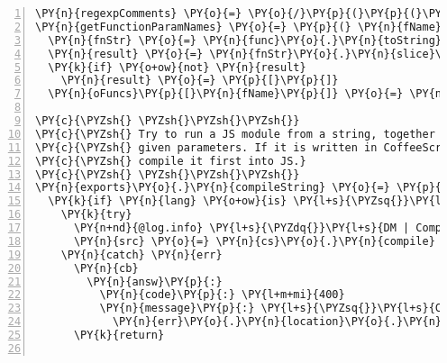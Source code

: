 \begin{Verbatim}[fontsize=\scriptsize,commandchars=\\\{\},numbers=left,firstnumber=1,stepnumber=1]
\PY{n}{regexpComments} \PY{o}{=} \PY{o}{/}\PY{p}{(}\PY{p}{(}\PYZbs{}\PY{o}{/}\PYZbs{}\PY{o}{/}\PY{o}{.}\PY{o}{*}\PY{err}{\PYZdl{}}\PY{p}{)}\PY{o}{|}\PY{p}{(}\PYZbs{}\PY{o}{/}\PYZbs{}\PY{o}{*}\PY{p}{[}\PYZbs{}\PY{n}{s}\PYZbs{}\PY{n}{S}\PY{p}{]}\PY{o}{*}\PY{err}{?}\PYZbs{}\PY{o}{*}\PYZbs{}\PY{o}{/}\PY{p}{)}\PY{p}{)}\PY{o}{/}\PY{n}{mg}\PY{p}{;}
\PY{n}{getFunctionParamNames} \PY{o}{=} \PY{p}{(} \PY{n}{fName}\PY{p}{,} \PY{n}{func}\PY{p}{,} \PY{n}{oFuncs} \PY{p}{)} \PY{o}{\PYZhy{}}\PY{o}{\PYZgt{}}
  \PY{n}{fnStr} \PY{o}{=} \PY{n}{func}\PY{o}{.}\PY{n}{toString}\PY{p}{(}\PY{p}{)}\PY{o}{.}\PY{n}{replace} \PY{n}{regexpComments}\PY{p}{,} \PY{l+s}{\PYZsq{}}\PY{l+s}{\PYZsq{}}
  \PY{n}{result} \PY{o}{=} \PY{n}{fnStr}\PY{o}{.}\PY{n}{slice}\PY{p}{(} \PY{n}{fnStr}\PY{o}{.}\PY{n}{indexOf}\PY{p}{(} \PY{l+s}{\PYZsq{}}\PY{l+s}{(}\PY{l+s}{\PYZsq{}} \PY{p}{)} \PY{o}{+} \PY{l+m+mi}{1}\PY{p}{,} \PY{n}{fnStr}\PY{o}{.}\PY{n}{indexOf}\PY{p}{(} \PY{l+s}{\PYZsq{}}\PY{l+s}{)}\PY{l+s}{\PYZsq{}} \PY{p}{)} \PY{p}{)}\PY{o}{.}\PY{n}{match} \PY{o}{/}\PY{p}{(}\PY{p}{[}\PY{o}{\PYZca{}}\PYZbs{}\PY{n}{s}\PY{p}{,}\PY{p}{]}\PY{o}{+}\PY{p}{)}\PY{o}{/}\PY{n}{g}
  \PY{k}{if} \PY{o+ow}{not} \PY{n}{result}
    \PY{n}{result} \PY{o}{=} \PY{p}{[}\PY{p}{]}
  \PY{n}{oFuncs}\PY{p}{[}\PY{n}{fName}\PY{p}{]} \PY{o}{=} \PY{n}{result}

\PY{c}{\PYZsh{} \PYZsh{}\PYZsh{}\PYZsh{}}
\PY{c}{\PYZsh{} Try to run a JS module from a string, together with the}
\PY{c}{\PYZsh{} given parameters. If it is written in CoffeeScript we}
\PY{c}{\PYZsh{} compile it first into JS.}
\PY{c}{\PYZsh{} \PYZsh{}\PYZsh{}\PYZsh{}}
\PY{n}{exports}\PY{o}{.}\PY{n}{compileString} \PY{o}{=} \PY{p}{(} \PY{n}{src}\PY{p}{,} \PY{n}{userId}\PY{p}{,} \PY{n}{oRule}\PY{p}{,} \PY{n}{modId}\PY{p}{,} \PY{n}{lang}\PY{p}{,} \PY{n}{modType}\PY{p}{,} \PY{n}{dbMod}\PY{p}{,} \PY{n}{cb} \PY{p}{)} \PY{o}{=}\PY{o}{\PYZgt{}}
  \PY{k}{if} \PY{n}{lang} \PY{o+ow}{is} \PY{l+s}{\PYZsq{}}\PY{l+s}{CoffeeScript}\PY{l+s}{\PYZsq{}}
    \PY{k}{try}
      \PY{n+nd}{@log.info} \PY{l+s}{\PYZdq{}}\PY{l+s}{DM | Compiling module }\PY{l+s}{\PYZsq{}}\PY{l+s}{\PYZsh{}\PYZob{} modId \PYZcb{}}\PY{l+s}{\PYZsq{}}\PY{l+s}{ for user }\PY{l+s}{\PYZsq{}}\PY{l+s}{\PYZsh{}\PYZob{} userId \PYZcb{}}\PY{l+s}{\PYZsq{}}\PY{l+s}{\PYZdq{}}
      \PY{n}{src} \PY{o}{=} \PY{n}{cs}\PY{o}{.}\PY{n}{compile} \PY{n}{src}
    \PY{n}{catch} \PY{n}{err}
      \PY{n}{cb}
        \PY{n}{answ}\PY{p}{:}
          \PY{n}{code}\PY{p}{:} \PY{l+m+mi}{400}
          \PY{n}{message}\PY{p}{:} \PY{l+s}{\PYZsq{}}\PY{l+s}{Compilation of CoffeeScript failed at line }\PY{l+s}{\PYZsq{}} \PY{o}{+}
            \PY{n}{err}\PY{o}{.}\PY{n}{location}\PY{o}{.}\PY{n}{first\PYZus{}line}
      \PY{k}{return}


\end{Verbatim}
